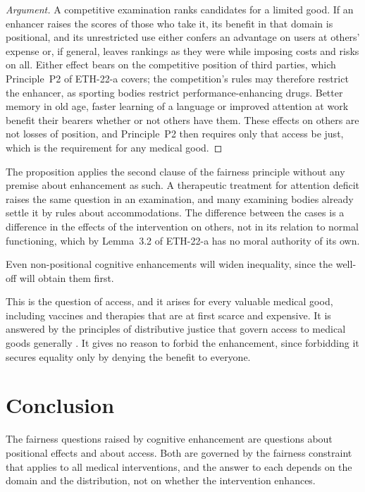 \documentclass{situationist-preprint}
\begin{document}
\begin{proof}[Argument]
A competitive examination ranks candidates for a limited good. If an enhancer raises the scores of those who take it, its benefit in that domain is positional, and its unrestricted use either confers an advantage on users at others' expense or, if general, leaves rankings as they were while imposing costs and risks on all. Either effect bears on the competitive position of third parties, which Principle~P2 of ETH-22-a covers; the competition's rules may therefore restrict the enhancer, as sporting bodies restrict performance-enhancing drugs. Better memory in old age, faster learning of a language or improved attention at work benefit their bearers whether or not others have them. These effects on others are not losses of position, and Principle~P2 then requires only that access be just, which is the requirement for any medical good.
\end{proof}

The proposition applies the second clause of the fairness principle without any premise about enhancement as such. A therapeutic treatment for attention deficit raises the same question in an examination, and many examining bodies already settle it by rules about accommodations. The difference between the cases is a difference in the effects of the intervention on others, not in its relation to normal functioning, which by Lemma~3.2 of ETH-22-a has no moral authority of its own.

\begin{objection}
Even non-positional cognitive enhancements will widen inequality, since the well-off will obtain them first.
\end{objection}

\begin{reply}
This is the question of access, and it arises for every valuable medical good, including vaccines and therapies that are at first scarce and expensive. It is answered by the principles of distributive justice that govern access to medical goods generally \citep{Buchanan2011}. It gives no reason to forbid the enhancement, since forbidding it secures equality only by denying the benefit to everyone.
\end{reply}

\section{Conclusion}

The fairness questions raised by cognitive enhancement are questions about positional effects and about access. Both are governed by the fairness constraint that applies to all medical interventions, and the answer to each depends on the domain and the distribution, not on whether the intervention enhances.
\end{document}

